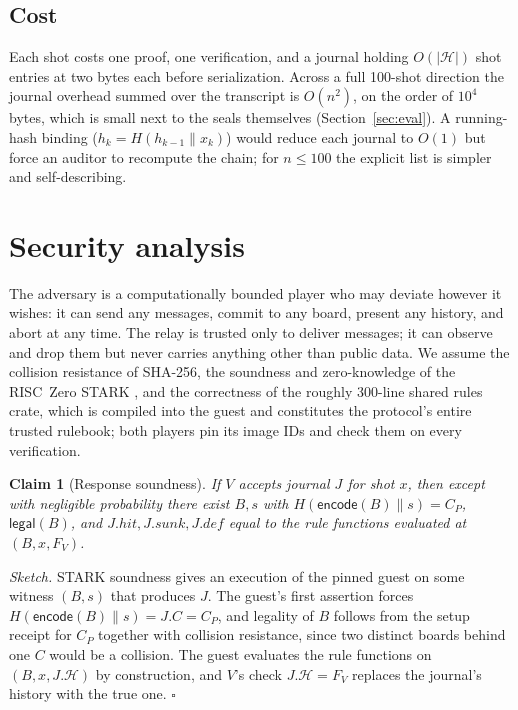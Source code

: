 \documentclass[11pt,a4paper]{article}
\newtheorem{claim}{Claim}
\newcommand{\C}{\ensuremath{C}}
\begin{document}
\subsection{Cost}

Each shot costs one proof, one verification, and a journal holding
$O(|\mathcal{H}|)$ shot entries at two bytes each before serialization. Across a
full 100-shot direction the journal overhead summed over the transcript is
$O(n^2)$, on the order of $10^4$ bytes, which is small next to the seals
themselves (Section~\ref{sec:eval}). A running-hash binding
($h_k = H(h_{k-1} \| x_k)$) would reduce each journal to $O(1)$ but force an
auditor to recompute the chain; for $n \le 100$ the explicit list is simpler
and self-describing.

\section{Security analysis}
\label{sec:security}

The adversary is a computationally bounded player who may deviate however it
wishes: it can send any messages, commit to any board, present any history, and
abort at any time. The relay is trusted only to deliver messages; it can
observe and drop them but never carries anything other than public data. We
assume the collision resistance of SHA-256, the soundness and zero-knowledge of
the RISC~Zero STARK \cite{risc0,starks}, and the correctness of the roughly
300-line shared rules crate, which is compiled into the guest and constitutes
the protocol's entire trusted rulebook; both players pin its image IDs and
check them on every verification.

\begin{claim}[Response soundness]
If $V$ accepts journal $J$ for shot $x$, then except with negligible
probability there exist $B, s$ with $H(\mathsf{encode}(B)\|s) = \C_P$,
$\mathsf{legal}(B)$, and $J.\mathit{hit}, J.\mathit{sunk}, J.\mathit{def}$
equal to the rule functions evaluated at $(B, x, F_V)$.
\end{claim}
\emph{Sketch.} STARK soundness gives an execution of the pinned guest on some
witness $(B,s)$ that produces $J$. The guest's first assertion forces
$H(\mathsf{encode}(B)\|s) = J.\C = \C_P$, and legality of $B$ follows from the
setup receipt for $\C_P$ together with collision resistance, since two distinct
boards behind one $\C$ would be a collision. The guest evaluates the rule
functions on $(B, x, J.\mathcal{H})$ by construction, and $V$'s check
$J.\mathcal{H} = F_V$ replaces the journal's history with the true one.
\hfill$\square$
\end{document}
